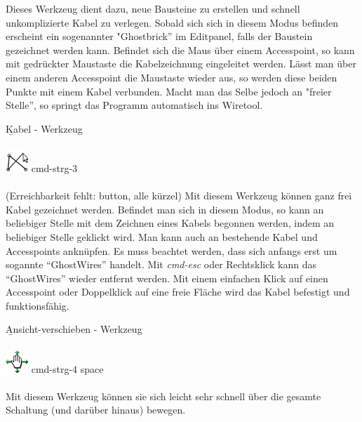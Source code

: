 \documentclass[12pt,a4paper]{scrartcl}
\newcommand{\fckWireTool}{Kabel - Werkzeug\xspace}
\newcommand{\fckMoveViewportTool}{Ansicht-verschieben - Werkzeug\xspace}
\begin{document}
\begin{enum}
		Dieses Werkzeug dient dazu, neue Bausteine zu erstellen und schnell unkomplizierte Kabel zu verlegen. Sobald sich sich in diesem Modus befinden erscheint ein sogenannter "Ghostbrick'' im Editpanel, falls der Baustein gezeichnet werden kann. Befindet sich die Maus über einem Accesspoint, so kann mit gedrückter Maustaste die Kabelzeichnung eingeleitet werden. Lässt man über einem anderen Accesspoint die Maustaste wieder aus, so werden diese beiden Punkte mit einem Kabel verbunden. Macht man das Selbe jedoch an "freier Stelle'', so springt das Programm automatisch ins Wiretool. \\
	\item \b{\fckWireTool} \\ \\
		{\Large \hspace{0.5em} \includegraphics[height=2ex]{images/wiretool.png} \hspace{0.5em}\textbullet \hspace{0.5em} \gls{cmd-strg-3}} \\ \\
		(Erreichbarkeit fehlt: button, alle kürzel)
		Mit diesem Werkzeug können ganz frei Kabel gezeichnet werden. Befindet man sich in diesem Modus, so kann an beliebiger Stelle mit dem Zeichnen eines Kabels begonnen werden, indem an beliebiger Stelle geklickt wird. Man kann auch an bestehende Kabel und Accesspoints anknüpfen. Es muss beachtet werden, dass sich anfangs erst um sogannte ``GhostWires'' handelt. Mit \textit{\gls{cmd-esc}} oder Rechtsklick kann das ``GhostWires'' wieder entfernt werden. Mit einem einfachen Klick auf einen Accesspoint oder Doppelklick auf eine freie Fläche wird das Kabel befestigt und funktionsfähig. \\
	\item \b{\fckMoveViewportTool} \\ \\
		{\Large \hspace{0.5em} \includegraphics[height=2ex]{images/moveviewporttool.png} \hspace{0.5em}\textbullet \hspace{0.5em} \gls{cmd-strg-4} \hspace{0.5em}\textbullet \hspace{0.5em} \gls{space}} \\ \\
		Mit diesem Werkzeug können sie sich leicht sehr schnell über die gesamte Schaltung (und darüber hinaus) bewegen. \\
\end{enum}
\end{document}
